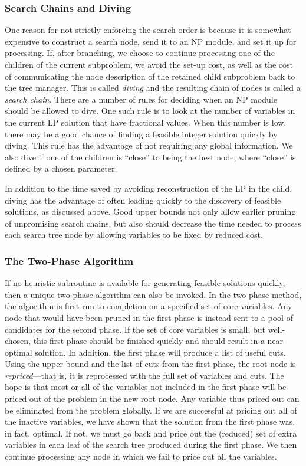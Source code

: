 \subsubsection{Search Chains and Diving}

One reason for not strictly enforcing the search order is because it
is somewhat expensive to construct a search node, send it to an NP
module, and set it up for processing. If, after branching, we choose
to continue processing one of the children of the current subproblem,
we avoid the set-up cost, as well as the cost of communicating the
node description of the retained child subproblem back to the tree
manager. This is called {\em diving} and the resulting chain of nodes
is called a {\em search chain}. There are a number of rules for
deciding when an NP module should be allowed to dive. One such rule is
to look at the number of variables in the current LP solution that
have fractional values. When this number is low, there may be a good
chance of finding a feasible integer solution quickly by diving. This
rule has the advantage of not requiring any global information. We
also dive if one of the children is ``close'' to being the best node,
where ``close'' is defined by a chosen parameter.

In addition to the time saved by avoiding reconstruction of the LP in
the child, diving has the advantage of often leading quickly to the
discovery of feasible solutions, as discussed above. Good upper bounds
not only allow earlier pruning of unpromising search chains, but also
should decrease the time needed to process each search tree node by
allowing variables to be fixed by reduced cost.

\subsubsection{The Two-Phase Algorithm}
\label{two-phase}

If no heuristic subroutine is available for generating feasible
solutions quickly, then a unique two-phase algorithm can also be
invoked. In the two-phase method, the algorithm is first run to
completion on a specified set of core variables. Any node that would
have been pruned in the first phase is instead sent to a pool of
candidates for the second phase. If the set of core variables is
small, but well-chosen, this first phase should be finished quickly
and should result in a near-optimal solution. In addition, the first
phase will produce a list of useful cuts. Using the upper bound and
the list of cuts from the first phase, the root node is {\em
repriced}---that is, it is reprocessed with the full set of variables
and cuts. The hope is that most or all of the variables not included
in the first phase will be priced out of the problem in the new root
node. Any variable thus priced out can be eliminated from the problem
globally. If we are successful at pricing out all of the inactive
variables, we have shown that the solution from the first phase was,
in fact, optimal. If not, we must go back and price out the (reduced)
set of extra variables in each leaf of the search tree produced during
the first phase. We then continue processing any node in which we fail
to price out all the variables.


